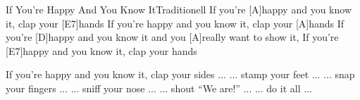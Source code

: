 \documentclass[../main.tex]{subfiles}
\begin{document}
\begin{song}{If You're Happy And You Know It}{Traditionell}{}
If you're [A]happy and you know it, clap your [E7]hands
If you're happy and you know it, clap your [A]hands
If you're [D]happy and you know it and you [A]really want to show it,
If you're [E7]happy and you know it, clap your hands


If you're happy and you know it, clap your sides ...
... stamp your feet ...
... snap your fingers ...
... sniff your nose ...
... shout ``We are!'' ...
... do it all ...
\end{song}
\end{document}
